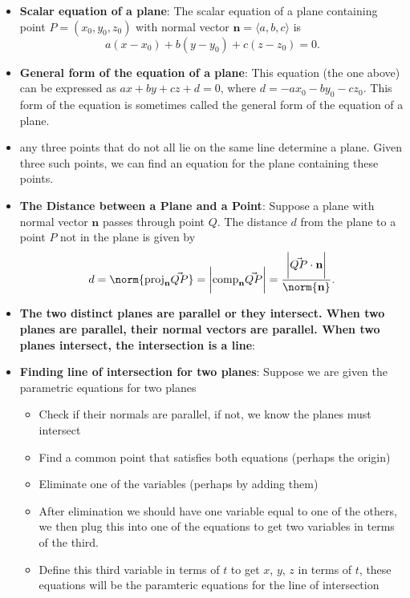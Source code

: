\documentclass{report}
\begin{document}
\begin{itemize}
    \item \textbf{Scalar equation of a plane}:
        The scalar equation of a plane containing point $P=(x_0, y_0, z_0)$ with normal vector $\mathbf{n}=\langle a, b, c \rangle$ is
        \[
            a(x-x_0) + b(y-y_0) + c(z-z_0) = 0.
        \]
    \item \textbf{General form of the equation of a plane}:
        This equation (the one above) can be expressed as $ax + by + cz + d = 0$, where $d = -ax_0 - by_0 - cz_0$. This form of the equation is sometimes called the general form of the equation of a plane.
    \item any three points that do not all lie on the same line determine a plane. Given three such points, we can find an equation for the plane containing these points.
    \item \textbf{The Distance between a Plane and a Point}: 
        Suppose a plane with normal vector  $\mathbf{n}$ passes through point  $Q$. The distance  $d$ from the plane to a point  $P$ not in the plane is given by
        \begin{align*}
             d = \norm{\text{proj}_{\mathbf{n}}\vec{QP}} = \bigg\lvert \text{comp}_{\mathbf{n}}\vec{QP} \bigg\rvert = \frac{\bigg\lvert \vec{QP} \cdot \mathbf{n} \bigg\rvert}{\norm{\mathbf{n}}}
        .\end{align*}
    \item \textbf{The two distinct planes are parallel or they intersect. When two planes are parallel, their normal vectors are parallel. When two planes intersect, the intersection is a line}:
    \item \textbf{Finding line of intersection for two planes}: Suppose we are given the parametric equations for two planes
        \begin{itemize}
            \item Check if their normals are parallel, if not, we know the planes must intersect
            \item Find a common point that satisfies both equations (perhaps the origin)
            \item Eliminate one of the variables (perhaps by adding them)
            \item After elimination we should have one variable equal to one of the others, we then plug this into one of the equations to get two variables in terms of the third.
            \item Define this third variable in terms of $t$ to get $x$, $y$, $z$ in terms of $t$, these equations will be the paramteric equations for the line of intersection

\end{itemize}
\end{itemize}
\end{document}

